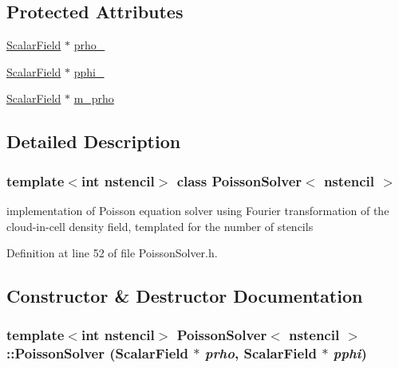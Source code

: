 \subsection*{Protected Attributes}
\begin{DoxyCompactItemize}
\item 
\hyperlink{classScalarField}{ScalarField} $\ast$ \hyperlink{classPoissonSolver_ae63b29dc18467f15d9258dd1d6869c6f}{prho\_\-}
\item 
\hyperlink{classScalarField}{ScalarField} $\ast$ \hyperlink{classPoissonSolver_a3dc6dd8a072a8b59733a193d8795f04c}{pphi\_\-}
\item 
\hyperlink{classScalarField}{ScalarField} $\ast$ \hyperlink{classPoissonSolver_abc1e13ccea710525220e970d74397ff4}{m\_\-prho}
\end{DoxyCompactItemize}


\subsection{Detailed Description}
\subsubsection*{template$<$int nstencil$>$ class PoissonSolver$<$ nstencil $>$}

implementation of Poisson equation solver using Fourier transformation of the cloud-\/in-\/cell density field, templated for the number of stencils 

Definition at line 52 of file PoissonSolver.h.



\subsection{Constructor \& Destructor Documentation}
\subsubsection[{PoissonSolver}]{\setlength{\rightskip}{0pt plus 5cm}template$<$int nstencil$>$ {\bf PoissonSolver}$<$ nstencil $>$::{\bf PoissonSolver} ({\bf ScalarField} $\ast$ {\em prho}, \/  {\bf ScalarField} $\ast$ {\em pphi})}\label{classPoissonSolver_a7ddd43d24b62636d55f26332b5d34dbc}



